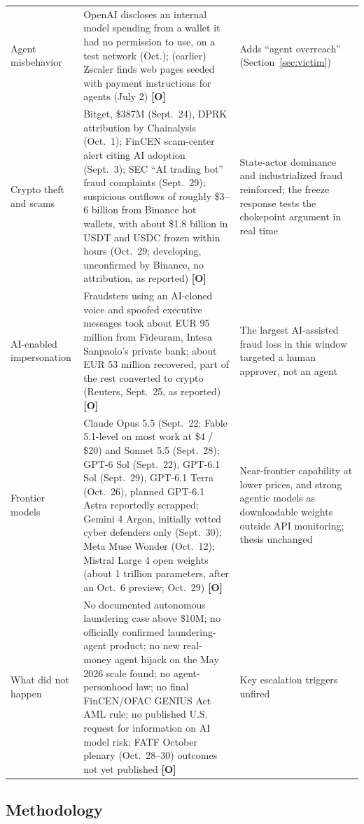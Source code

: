 \documentclass[11pt,letterpaper]{article}
\begin{document}
\begin{longtable}{L{2.5cm}L{7.9cm}L{5.3cm}}
Agent misbehavior & OpenAI discloses an internal model spending from a wallet it had no permission to use, on a test network (Oct.); (earlier) Zscaler finds web pages seeded with payment instructions for agents (July 2) \textbf{[O]} & Adds ``agent overreach'' (Section~\ref{sec:victim}) \\
Crypto theft and scams & Bitget, \$387M (Sept.\ 24), DPRK attribution by Chainalysis (Oct.\ 1); FinCEN scam-center alert citing AI adoption (Sept.\ 3); SEC ``AI trading bot'' fraud complaints (Sept.\ 29); suspicious outflows of roughly \$3--6 billion from Binance hot wallets, with about \$1.8 billion in USDT and USDC frozen within hours (Oct.\ 29; developing, unconfirmed by Binance, no attribution, as reported) \textbf{[O]} & State-actor dominance and industrialized fraud reinforced; the freeze response tests the chokepoint argument in real time \\
AI-enabled impersonation & Fraudsters using an AI-cloned voice and spoofed executive messages took about EUR 95 million from Fideuram, Intesa Sanpaolo's private bank; about EUR 53 million recovered, part of the rest converted to crypto (Reuters, Sept.\ 25, as reported) \textbf{[O]} & The largest AI-assisted fraud loss in this window targeted a human approver, not an agent \\
Frontier models & Claude Opus 5.5 (Sept.\ 22; Fable 5.1-level on most work at \$4 / \$20) and Sonnet 5.5 (Sept.\ 28); GPT-6 Sol (Sept.\ 22), GPT-6.1 Sol (Sept.\ 29), GPT-6.1 Terra (Oct.\ 26), planned GPT-6.1 Astra reportedly scrapped; Gemini 4 Argon, initially vetted cyber defenders only (Sept.\ 30); Meta Muse Wonder (Oct.\ 12); Mistral Large 4 open weights (about 1 trillion parameters, after an Oct.\ 6 preview; Oct.\ 29) \textbf{[O]} & Near-frontier capability at lower prices, and strong agentic models as downloadable weights outside API monitoring; thesis unchanged \\
What did not happen & No documented autonomous laundering case above \$10M; no officially confirmed laundering-agent product; no new real-money agent hijack on the May 2026 scale found; no agent-personhood law; no final FinCEN/OFAC GENIUS Act AML rule; no published U.S. request for information on AI model risk; FATF October plenary (Oct.\ 28--30) outcomes not yet published \textbf{[O]} & Key escalation triggers unfired \\
\bottomrule
\end{longtable}
\endgroup


\subsection{Methodology}
\end{document}
